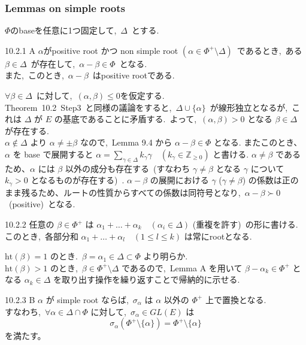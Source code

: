 \documentclass[uplatex,dvipdfmx]{jsarticle}
\begin{document}
\subsubsection{Lemmas on simple roots}
$\Phi$のbaseを任意に1つ固定して,~$\Delta$~とする.\\
\begin{mylemma}{10.2.1 A}
    $\alpha$がpositive root かつ non simple root $(\alpha \in \Phi^+ \setminus \Delta)$~であるとき,~ある$\beta \in \Delta$~が存在して,~$\alpha - \beta \in \Phi$~となる.\\
    また,~このとき,~$\alpha - \beta$~はpositive rootである.
\end{mylemma}
\begin{myproof}
    $\forall \beta \in \Delta$~に対して,~$(\alpha,\beta)\leq 0$を仮定する.\\
    Theorem~10.2~Step3~と同様の議論をすると,~$\Delta \cup \{\alpha\}$~が線形独立となるが,~これは $\Delta$ が $E$ の基底であることに矛盾する.~よって,~$(\alpha, \beta) > 0$ となる $\beta \in \Delta$ が存在する.\\
    $\alpha \notin \Delta$ より $\alpha \neq \pm \beta$ なので,~Lemma 9.4 から $\alpha - \beta \in \Phi$ となる.
    またこのとき、$\alpha$ を base で展開すると $\alpha = \sum_{\gamma \in \Delta} k_\gamma \gamma \quad (k_\gamma \in \mathbb{Z}_{\ge 0})$ と書ける.
    $\alpha \neq \beta$ であるため、$\alpha$ には $\beta$ 以外の成分も存在する~(すなわち $\gamma \neq \beta$ となる $\gamma$ について $k_\gamma > 0$ となるものが存在する)~.
    $\alpha - \beta$ の展開における $\gamma$ ($\gamma \neq \beta$) の係数は正のまま残るため、ルートの性質からすべての係数は同符号となり,~$\alpha - \beta \succ 0$~(positive)~となる.
\end{myproof}
\begin{mycor}{10.2.2}
    任意の $\beta \in \Phi^+$ は $\alpha_1 + \dots + \alpha_k \quad (\alpha_i \in \Delta)$ (重複を許す)~の形に書ける.\\
    このとき,~各部分和 $\alpha_1 + \dots + \alpha_l \quad (1 \le l \le k)$ は常にrootとなる.
\end{mycor}
\begin{myproof}
    $\text{ht}(\beta) = 1$ のとき.~$\beta = \alpha_1 \in \Delta \subset \Phi$ より明らか.\\
    $\text{ht}(\beta) > 1$ のとき,~$\beta \in \Phi^+ \setminus \Delta$ であるので,~Lemma A を用いて $\beta - \alpha_k \in \Phi^+$ となる $\alpha_k \in \Delta$ を取り出す操作を繰り返すことで帰納的に示せる.
\end{myproof}
\begin{mylemma}{10.2.3 B}
    $\alpha$ が simple root ならば,~$\sigma_\alpha$ は $\alpha$ 以外の $\Phi^+$ 上で置換となる.\\
    すなわち,~$\forall \alpha \in \Delta \cap \Phi$ に対して,~$\sigma_\alpha \in GL(E)$ は
    \begin{equation*}
        \sigma_\alpha(\Phi^+ \setminus \{\alpha\}) = \Phi^+ \setminus \{\alpha\}
    \end{equation*}
    を満たす。
\end{mylemma}
\end{document}
